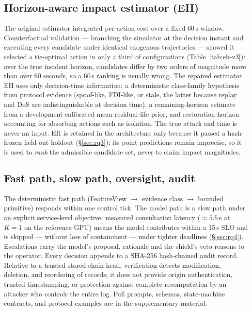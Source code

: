 \subsection{Horizon-aware impact estimator (EH)}
\label{sec:method-estimator}
The original estimator integrated per-action cost over a fixed 60\,s
window. Counterfactual validation --- branching the simulator at the
decision instant and executing every candidate under identical exogenous
trajectories --- showed it selected a tie-optimal action in only a third of
configurations (Table~\ref{tab:eh-v3}): over the true incident horizon,
candidates differ by two orders of magnitude more than over 60 seconds, so a
60\,s ranking is usually wrong. The repaired estimator EH uses only
decision-time information: a deterministic class-family hypothesis from
protocol evidence (spoof-like, FDI-like, or stale, the latter because
replay and DoS are indistinguishable at decision time), a
remaining-horizon estimate from a development-calibrated mean-residual-life prior,
and restoration-horizon accounting for absorbing actions such as
isolation. The true attack end time is never an input. EH is retained in
the architecture only because it passed a hash-frozen held-out
holdout (\S\ref{sec:rq3}); its point predictions remain
imprecise, so it is used to \emph{rank} the admissible candidate set, never to claim
impact magnitudes.

\subsection{Fast path, slow path, oversight, audit}
\label{sec:method-deployment}
The deterministic fast path (FeatureView $\rightarrow$ evidence class
$\rightarrow$ bounded primitive) responds within one control tick. The
model path is a slow path under an explicit service-level objective:
measured consultation latency (${\approx}5.5$\,s at $K{=}1$ on the reference GPU)
means the model contributes within a 15\,s SLO and is skipped ---
without loss of containment --- under tighter deadlines
(\S\ref{sec:rq4}). Escalations carry the model's proposal,
rationale and the shield's veto reasons to the operator. Every decision
appends to a SHA-256 hash-chained audit record. Relative to a trusted stored
chain head, verification detects modification, deletion, and reordering of
records; it does not provide origin authentication, trusted timestamping, or
protection against complete recomputation by an attacker who controls the entire
log. Full prompts, schemas,
state-machine contracts, and protocol examples are in the supplementary
material.
